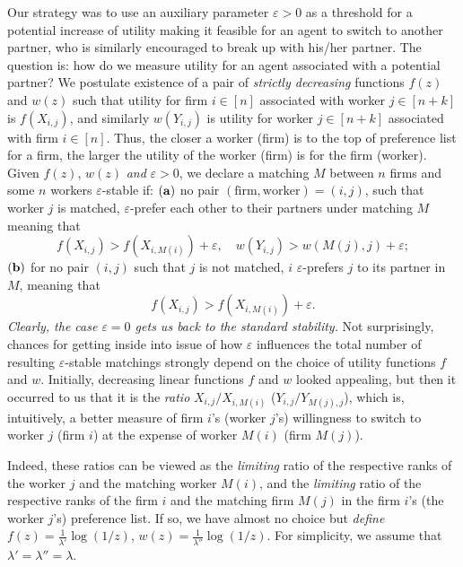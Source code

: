 \documentclass[11pt]{amsart}
\def\eps{\varepsilon}
\def\la{\lambda}
\theoremstyle{remark}
\numberwithin{equation}{section}
\newcommand{\Exp}[1]{\text{Exp}\left(#1\right)}
\begin{document}
Our strategy was to use an auxiliary parameter $\eps>0$ as a threshold for a potential increase of utility making it feasible for an agent to switch to another partner, who is similarly encouraged to break up with his/her partner. The question is: how do we measure utility for an agent associated with a potential partner? We postulate existence of a pair of {\it strictly decreasing} functions $f(z)$ and $w(z)$ such that utility
for firm $i\in [n]$ associated with worker $j\in [n+k]$ is $f(X_{i,j})$, and similarly $w(Y_{i,j})$ is utility for worker $j\in [n+k]$ associated with firm $i\in [n]$. Thus, the closer a worker (firm) is to the top of preference list for a firm, the larger the utility of the worker (firm) is for the firm (worker). Given $f(z)$, $w(z)$ {\it and} $\eps>0$, we declare a matching $M$ between $n$ firms and some $n$ workers $
\eps$-stable if:  ${\bf (a)\/}$ no pair $(\text{firm},\text{worker})=(i, j)$, such that worker $j$ is matched, $\eps$-prefer each other to their partners under matching $M$ meaning that
\begin{equation}\label{1}
f(X_{i,j})>f(X_{i,M(i)})+\eps,\quad w(Y_{i,j})>w(M(j),j)+\eps;
\end{equation}
 ${\bf (b)\/}$ for no pair $(i,j)$ such that $j$ is not matched, $i$ $\eps$-prefers $j$ to its partner in $M$,
 meaning that
\begin{equation}\label{2}
f(X_{i,j})>f(X_{i,M(i)})+\eps.
\end{equation}
{\it Clearly, the case $\eps=0$ gets us back to the standard stability.\/} Not surprisingly, chances for getting inside into issue of how $\eps$ influences the total number of resulting $\eps$-stable matchings strongly depend on the choice of utility functions $f$ and 
$w$. Initially, decreasing linear functions $f$ and $w$ looked appealing, but then it occurred to us that it is the {\it ratio\/} $X_{i,j}/X_{i,M(i)}$
($Y_{i,j}/Y_{M(j),j}$), which is, intuitively, a better measure of firm $i$'s (worker $j$'s) willingness to switch to worker $j$ (firm $i$)
at the expense of worker $M(i)$ (firm $M(j)$). 

Indeed, these ratios can be viewed as the {\it limiting\/} ratio of the respective ranks of the worker $j$ and the matching worker $M(i)$, and the {\it limiting\/} ratio of the respective ranks of the firm $i$ and the matching firm $M(j)$ in the firm $i$'s 
(the worker $j$'s) preference list. If so, we have almost no choice but {\it define\/} $f(z)=\frac{1}{\la'}\log(1/z)$, $w(z)=\frac{1}{\la''}\log(1/z)$. For simplicity, we assume that $\la'=\la''=\la$. 
\end{document}

